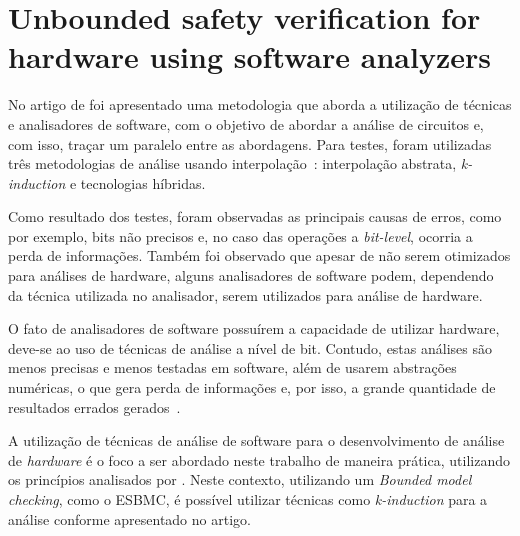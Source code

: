 \section{Unbounded safety verification for hardware using software analyzers}
No artigo de  foi apresentado uma metodologia que aborda a utilização de técnicas e analisadores de software, com o objetivo de abordar a análise de circuitos e, com isso, traçar um paralelo entre as abordagens. Para testes, foram utilizadas três metodologias de análise usando interpolação~\cite{beyer2011cpachecker}: interpolação abstrata\cite{blanchet2003static}, \textit{k-induction}\cite{donaldson2011software} e tecnologias híbridas. 

\par
Como resultado dos testes, foram observadas as principais causas de erros, como por exemplo, bits não precisos e, no caso das operações a \textit{bit-level}, ocorria a perda de informações. Também foi observado que apesar de não serem otimizados para análises de hardware, alguns analisadores de software podem, dependendo da técnica utilizada no analisador, serem utilizados para análise de hardware\cite{mukherjee2016unbounded}.

\par
O fato de analisadores de software possuírem a capacidade de utilizar hardware, deve-se ao uso de técnicas de análise a nível de bit. Contudo, estas análises são menos precisas e menos testadas em software, além de usarem abstrações numéricas, o que gera perda de informações e, por isso, a grande quantidade de resultados errados gerados~\cite{mukherjee2016unbounded}.

\par
A utilização de técnicas de análise de software para o desenvolvimento de análise de \textit{hardware} é o foco a ser abordado neste trabalho de maneira prática, utilizando os princípios analisados por \cite{mukherjee2016unbounded}. Neste contexto, utilizando um \textit{Bounded model checking}, como o ESBMC, é possível utilizar técnicas como \textit{k-induction} para a análise conforme apresentado no artigo.

